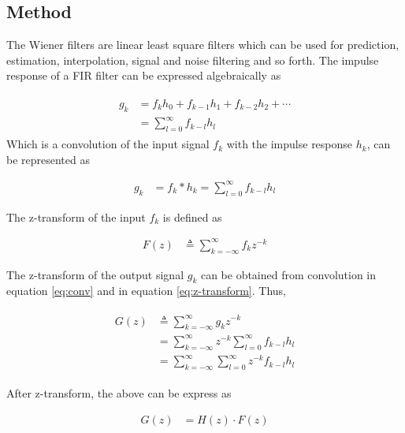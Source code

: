 \documentclass[8pt,a4paper]{article}
\begin{document}
\begin{multicols}{2}
\section*{Method}

The Wiener filters are linear least square filters which can be used for prediction, estimation, interpolation, signal and noise filtering and so forth.\cite{widrow1987}
The impulse response of a FIR filter can be expressed algebraically as 

\begin{align}
  \begin{split}
  g_{k} &= f_{k}h_{0} + f_{k-1}h_{1} + f_{k-2}h_{2} + \cdots \\
        &= \sum_{l=0}^{\infty} f_{k-l}h_{l}
  \end{split}
\end{align}
Which is a convolution of the input signal $f_{k}$ with the impulse response $h_{k}$, can be represented as

\begin{align}
\label{eq:conv}
  g_{k} &= f_{k} * h_{k} 
        = \sum_{l=0}^{\infty} f_{k-l}h_{l} 
\end{align}

The z-transform of the input $f_{k}$ is defined as

\begin{align}
  \label{eq:z-transform}
  F(z)&\triangleq \sum_{k=-\infty}^{\infty} f_{k}z^{-k}
\end{align}

The z-transform of the output signal $g_{k}$ can be obtained from convolution in equation \ref{eq:conv} and in equation \ref{eq:z-transform}. Thus, 

\begin{align}
  \begin{split}
  G(z)&\triangleq \sum_{k=-\infty}^{\infty} g_{k}z^{-k}\\
      &=\sum_{k=-\infty}^{\infty} z^{-k} \sum_{l=0}^{\infty} f_{k-l}h_{l} \\
      &=\sum_{k=-\infty}^{\infty} \sum_{l=0}^{\infty} z^{-k}f_{k-l}h_{l}
  \end{split}
\end{align}

After z-transform, the above can be express as

\begin{align}
  G(z) &= H(z) \cdot F(z)
\end{align}


\end{multicols}
\end{document}
